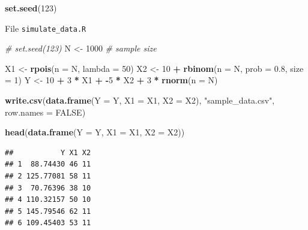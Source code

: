 \documentclass[]{book}
\newenvironment{Shaded}{\begin{snugshade}}{\end{snugshade}}
\newcommand{\KeywordTok}[1]{\textcolor[rgb]{0.13,0.29,0.53}{\textbf{#1}}}
\newcommand{\DataTypeTok}[1]{\textcolor[rgb]{0.13,0.29,0.53}{#1}}
\newcommand{\DecValTok}[1]{\textcolor[rgb]{0.00,0.00,0.81}{#1}}
\newcommand{\FloatTok}[1]{\textcolor[rgb]{0.00,0.00,0.81}{#1}}
\newcommand{\StringTok}[1]{\textcolor[rgb]{0.31,0.60,0.02}{#1}}
\newcommand{\CommentTok}[1]{\textcolor[rgb]{0.56,0.35,0.01}{\textit{#1}}}
\newcommand{\OtherTok}[1]{\textcolor[rgb]{0.56,0.35,0.01}{#1}}
\newcommand{\OperatorTok}[1]{\textcolor[rgb]{0.81,0.36,0.00}{\textbf{#1}}}
\newcommand{\NormalTok}[1]{#1}
\theoremstyle{definition}
\theoremstyle{definition}
\theoremstyle{definition}
\theoremstyle{remark}
\begin{document}
\begin{Shaded}
\begin{Highlighting}[]
\KeywordTok{set.seed}\NormalTok{(}\DecValTok{123}\NormalTok{)}
\end{Highlighting}
\end{Shaded}

File \texttt{simulate\_data.R}

\begin{Shaded}
\begin{Highlighting}[]
\CommentTok{# set.seed(123)}
\NormalTok{N <-}\StringTok{ }\DecValTok{1000} \CommentTok{# sample size}

\NormalTok{X1 <-}\StringTok{ }\KeywordTok{rpois}\NormalTok{(}\DataTypeTok{n =}\NormalTok{ N, }\DataTypeTok{lambda =} \DecValTok{50}\NormalTok{)}
\NormalTok{X2 <-}\StringTok{ }\DecValTok{10} \OperatorTok{+}\StringTok{ }\KeywordTok{rbinom}\NormalTok{(}\DataTypeTok{n =}\NormalTok{ N, }\DataTypeTok{prob =} \FloatTok{0.8}\NormalTok{, }\DataTypeTok{size =} \DecValTok{1}\NormalTok{)}
\NormalTok{Y <-}\StringTok{ }\DecValTok{10} \OperatorTok{+}\StringTok{ }\DecValTok{3} \OperatorTok{*}\StringTok{ }\NormalTok{X1 }\OperatorTok{+}\StringTok{ }\OperatorTok{-}\DecValTok{5} \OperatorTok{*}\StringTok{ }\NormalTok{X2 }\OperatorTok{+}\StringTok{ }\DecValTok{3} \OperatorTok{*}\StringTok{ }\KeywordTok{rnorm}\NormalTok{(}\DataTypeTok{n =}\NormalTok{ N)}

\KeywordTok{write.csv}\NormalTok{(}\KeywordTok{data.frame}\NormalTok{(}\DataTypeTok{Y =}\NormalTok{ Y, }\DataTypeTok{X1 =}\NormalTok{ X1, }\DataTypeTok{X2 =}\NormalTok{ X2),}
          \StringTok{"sample_data.csv"}\NormalTok{, }\DataTypeTok{row.names =} \OtherTok{FALSE}\NormalTok{)}
\end{Highlighting}
\end{Shaded}

\begin{Shaded}
\begin{Highlighting}[]
\KeywordTok{head}\NormalTok{(}\KeywordTok{data.frame}\NormalTok{(}\DataTypeTok{Y =}\NormalTok{ Y, }\DataTypeTok{X1 =}\NormalTok{ X1, }\DataTypeTok{X2 =}\NormalTok{ X2))}
\end{Highlighting}
\end{Shaded}

\begin{verbatim}
##           Y X1 X2
## 1  88.74430 46 11
## 2 125.77081 58 11
## 3  70.76396 38 10
## 4 110.32157 50 10
## 5 145.79546 62 11
## 6 109.45403 53 11
\end{verbatim}
\end{document}
